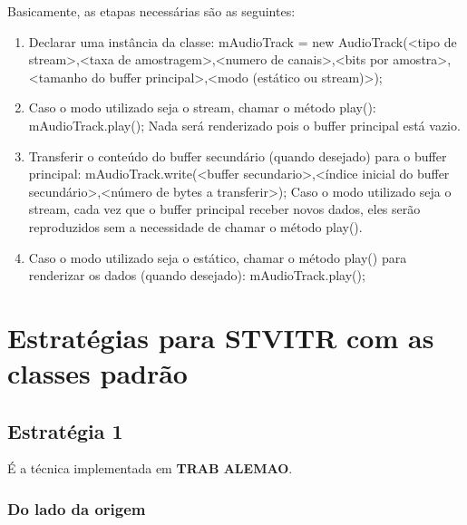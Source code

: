\documentclass{acm_proc_article-sp}
\newcommand{\todo}[1]{\textcolor[rgb]{1.00,0.00,0.00}{\bf \uppercase{#1}}}
\begin{document}
Basicamente, as etapas necessárias são as seguintes:
\begin{enumerate}
 \item Declarar uma instância da classe:
mAudioTrack = new AudioTrack(<tipo de stream>,<taxa de amostragem>,<numero de canais>,<bits por amostra>,<tamanho do buffer principal>,<modo (estático ou stream)>);
 \item Caso o modo utilizado seja o stream, chamar o método play():
mAudioTrack.play();
Nada será renderizado pois o buffer principal está vazio.
 \item Transferir o conteúdo do buffer secundário (quando desejado) para o buffer principal:
mAudioTrack.write(<buffer secundario>,<índice inicial do buffer secundário>,<número de bytes a transferir>);
Caso o modo utilizado seja o stream, cada vez que o buffer principal receber novos dados, eles serão reproduzidos sem a necessidade de chamar o método play().
 \item Caso o modo utilizado seja o estático, chamar o método play() para renderizar os dados (quando desejado):
mAudioTrack.play();
\end{enumerate}

\section{Estratégias para STVITR com as classes padrão}

\subsection{Estratégia 1}
É a técnica implementada em \todo{trab alemao}.

\subsubsection{Do lado da origem}
\end{document}

